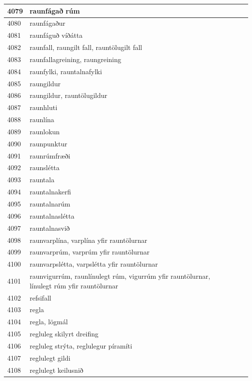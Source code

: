 \begin{longtable}{p{}|p{}|p{}|p{}|p{}}
\hline
4079 & raunfágað rúm &  &  &  \\
\hline
4080 & raunfágaður &  &  &  \\
\hline
4081 & raunfáguð víðátta &  &  &  \\
\hline
4082 & raunfall, raungilt fall, rauntölugilt fall &  &  &  \\
\hline
4083 & raunfallagreining, raungreining &  &  &  \\
\hline
4084 & raunfylki, rauntalnafylki &  &  &  \\
\hline
4085 & raungildur &  &  &  \\
\hline
4086 & raungildur, rauntölugildur &  &  &  \\
\hline
4087 & raunhluti &  &  &  \\
\hline
4088 & raunlína &  &  &  \\
\hline
4089 & raunlokun &  &  &  \\
\hline
4090 & raunpunktur &  &  &  \\
\hline
4091 & raunrúmfræði &  &  &  \\
\hline
4092 & raunslétta &  &  &  \\
\hline
4093 & rauntala &  &  &  \\
\hline
4094 & rauntalnakerfi &  &  &  \\
\hline
4095 & rauntalnarúm &  &  &  \\
\hline
4096 & rauntalnaslétta &  &  &  \\
\hline
4097 & rauntalnasvið &  &  &  \\
\hline
4098 & raunvarplína, varplína yfir rauntölurnar &  &  &  \\
\hline
4099 & raunvarprúm, varprúm yfir rauntölurnar &  &  &  \\
\hline
4100 & raunvarpslétta, varpslétta yfir rauntölurnar &  &  &  \\
\hline
4101 & raunvigurrúm, raunlínulegt rúm, vigurrúm yfir rauntölurnar, línulegt rúm yfir rauntölurnar &  &  &  \\
\hline
4102 & refsifall &  &  &  \\
\hline
4103 & regla &  &  &  \\
\hline
4104 & regla, lögmál &  &  &  \\
\hline
4105 & regluleg skilyrt dreifing &  &  &  \\
\hline
4106 & regluleg strýta, reglulegur píramíti &  &  &  \\
\hline
4107 & reglulegt gildi &  &  &  \\
\hline
4108 & reglulegt keilusnið &  &  &  \\

\end{longtable}
